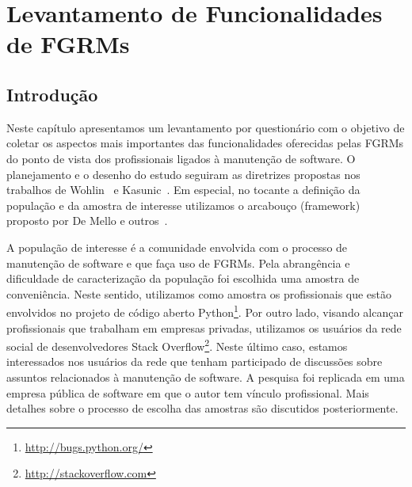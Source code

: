 \chapter{Levantamento de Funcionalidades de FGRMs}\label{ch:pesquisa-profissionais}

\section{Introdução}\label{sec:pesquisa-profissionais-intro}

Neste capítulo apresentamos um levantamento por questionário com o objetivo de
coletar os aspectos mais importantes das funcionalidades oferecidas pelas FGRMs
do ponto de vista dos profissionais ligados à manutenção de software. O
planejamento e o desenho do estudo seguiram as diretrizes propostas nos
trabalhos de Wohlin~\cite{wohlin2012experimentation} e
Kasunic~\cite{kasunic2005designing}. Em especial, no tocante a definição da
população e da amostra de interesse utilizamos o arcabouço (framework) proposto
por De Mello e outros~\cite{de2015investigating, de2014towards}.

A população de interesse é a comunidade envolvida com o processo de manutenção
de software e que faça uso de FGRMs. Pela abrangência e dificuldade de
caracterização da população foi escolhida uma amostra de conveniência. Neste
sentido, utilizamos como amostra os profissionais que estão envolvidos no
projeto de código aberto Python\footnote{\url{http://bugs.python.org/}}. Por
outro lado, visando alcançar profissionais que trabalham em empresas privadas,
utilizamos os usuários da rede social de desenvolvedores Stack
Overflow\footnote{\url{http://stackoverflow.com}}. Neste último caso, estamos
interessados nos usuários da rede que tenham participado de discussões sobre
assuntos relacionados à manutenção de software. A pesquisa foi replicada em uma
empresa pública de software em que o autor tem vínculo profissional. Mais
detalhes sobre o processo de escolha das amostras são discutidos
posteriormente.

